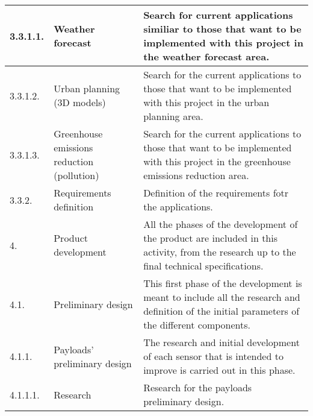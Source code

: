\begin{longtable}[H]{l >{\raggedright\arraybackslash}p{4cm} p{8cm}}
	\midrule
	
	3.3.1.1. & Weather forecast & Search for current applications similiar to those that want to be implemented with this project in the weather forecast area.\vspace{0.2cm} \\
	
	\midrule
	
	3.3.1.2. & Urban planning (3D models) & Search for the current applications to those that want to be implemented with this project in the urban planning area.\vspace{0.2cm} \\
	
	\midrule
	
	3.3.1.3. & Greenhouse emissions reduction (pollution) & Search for the current applications to those that want to be implemented with this project in the greenhouse emissions reduction area.\vspace{0.2cm} \\
	
	\midrule
	
	3.3.2. & Requirements definition & Definition of the requirements fotr the applications.\vspace{0.2cm} \\
	
	\midrule
	
	4. & Product development & All the phases of the development of the product are included in this activity, from the research up to the final technical specifications.\vspace{0.2cm} \\
	
	\midrule
	
	4.1. & Preliminary design & This first phase of the development is meant to include all the research and definition of the initial parameters of the different components.\vspace{0.2cm} \\
	
	\midrule
	
	4.1.1. & Payloads' preliminary design & The research and initial development of each sensor that is intended to improve is carried out in this phase.\vspace{0.2cm} \\
	
	\midrule
	
	4.1.1.1. & Research & Research for the payloads preliminary design.\vspace{0.2cm} \\
	

\end{longtable}
